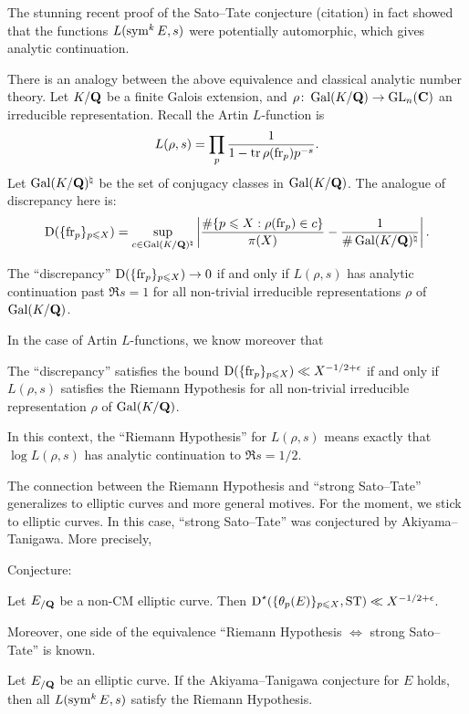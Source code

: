 The stunning recent proof of the Sato--Tate conjecture (citation) in fact 
showed that the functions $L(\operatorname{sym}^k E,s)$ were potentially automorphic, which 
gives analytic continuation. 

There is an analogy between the above equivalence and classical analytic number 
theory. Let $K/\mathbf{Q}$ be a finite Galois extension, and 
$\rho\colon \operatorname{Gal}(K/\mathbf{Q}) \to \operatorname{GL}_n(\mathbf{C})$ an irreducible representation. Recall 
the Artin $L$-function is 
\[
	L(\rho,s) = \prod_p \frac{1}{1-\operatorname{tr} \rho(\mathrm{fr}_p) p^{-s}} .
\]
Let $\operatorname{Gal}(K/\mathbf{Q})^\natural$ be the set of conjugacy classes in $\operatorname{Gal}(K/\mathbf{Q})$. 
The analogue of discrepancy here is: 
\[
	\operatorname{D}(\{\mathrm{fr}_p\}_{p\leqslant X}) = \sup_{c\in \operatorname{Gal}(K/\mathbf{Q})^\natural} \left| \frac{\# \{p\leqslant X : \rho(\mathrm{fr}_p) \in c\}}{\pi(X)} - \frac{1}{\# \operatorname{Gal}(K/\mathbf{Q})^\natural}\right| .
\]

\begin{theorem}
The ``discrepancy'' $\operatorname{D}(\{\mathrm{fr}_p\}_{p\leqslant X})\to 0$ if and only 
if $L(\rho,s)$ has analytic continuation past $\Re s=1$ for all non-trivial 
irreducible representations $\rho$ of $\operatorname{Gal}(K/\mathbf{Q})$. 
\end{theorem}

In the case of Artin $L$-functions, we know moreover that 

\begin{theorem}
The ``discrepancy'' satisfies the bound 
$\operatorname{D}(\{\mathrm{fr}_p\}_{p\leqslant X}) \ll X^{-1/2+\epsilon}$ if and only if 
$L(\rho,s)$ satisfies the Riemann Hypothesis for all non-trivial irreducible 
representation $\rho$ of $\operatorname{Gal}(K/\mathbf{Q})$. 
\end{theorem}

In this context, the ``Riemann Hypothesis'' for $L(\rho,s)$ means exactly that 
$\log L(\rho,s)$ has analytic continuation to $\Re s=1/2$. 

The connection between the Riemann Hypothesis and ``strong Sato--Tate'' 
generalizes to elliptic curves and more general motives. For the moment, we 
stick to elliptic curves. In this case, ``strong Sato--Tate'' was conjectured 
by Akiyama--Tanigawa. More precisely, 

Conjecture:

Let $E_{/\mathbf{Q}}$ be a non-CM elliptic curve. Then 
$\operatorname{D}^\star(\{\theta_p(E)\}_{p\leqslant X}, \mathrm{ST}) \ll X^{-1/2+\epsilon}$. 


Moreover, one side of the equivalence ``Riemann Hypothesis $\Leftrightarrow$ 
strong Sato--Tate'' is known. 

\begin{theorem}
Let $E_{/\mathbf{Q}}$ be an elliptic curve. If the Akiyama--Tanigawa conjecture for 
$E$ holds, then all $L(\operatorname{sym}^k E, s)$ satisfy the Riemann Hypothesis. 
\end{theorem}

